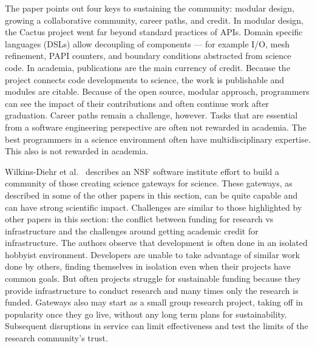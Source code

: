 \documentclass[11pt, oneside]{amsart}
\begin{document}
The paper points out four keys to sustaining the community: modular
design, growing a collaborative community, career paths, and credit. In
modular design, the Cactus project went far beyond standard practices
of APIs. Domain specific languages (DSLs) allow decoupling of
components --- for example I/O, mesh refinement, PAPI counters, and
boundary conditions abstracted from science code. In academia,
publications are the main currency of credit. Because the project
connects code developments to science, the work is publishable and
modules are citable. Because of the open source, modular approach,
programmers can see the impact of their contributions and often
continue work after graduation. Career paths remain a challenge,
however. Tasks that are essential from a software engineering
perspective are often not rewarded in academia. The best programmers
in a science environment often have multidisciplinary expertise. This
also is not rewarded in academia.

Wilkins-Diehr et al.~\cite{Wilkins-Diehr_WSSSPE} describes an NSF
software institute effort to build a community of those creating
science gateways for science. These gateways, as described in some of
the other papers in this section, can be quite capable and can have
strong scientific impact.  Challenges are similar to those highlighted
by other papers in this section: the conflict between funding for
research vs infrastructure and the challenges around getting academic
credit for infrastructure.
%
The authors observe that development is often done in an isolated
hobbyist environment. Developers are unable to take advantage of
similar work done by others, finding themselves in isolation even when their projects have common
goals. But often projects struggle for sustainable funding because
they provide infrastructure to conduct research and many times only
the research is funded. Gateways also may start as a small group
research project, taking off in popularity once they go live, without
any long term plans for sustainability.  Subsequent disruptions in
service can limit effectiveness and test the limits of the research
community's trust. %
\end{document}
